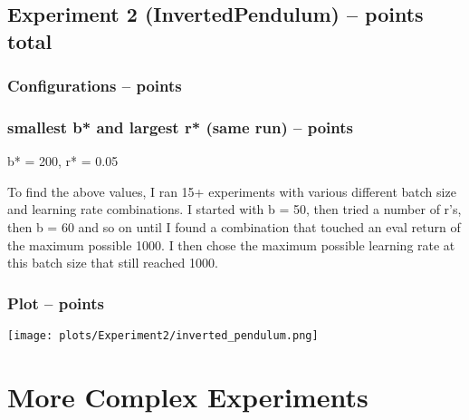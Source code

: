 \documentclass{article}
\begin{document}
\subsection{Experiment 2 (InvertedPendulum) --  points total\rbrack}

\subsubsection{Configurations --  points\rbrack}

\subsubsection{smallest \textbf{b*} and largest \textbf{r*} (same run) --  points\rbrack}
\begin{answer}[title=Q5.2.2,height=4cm,width=\linewidth]
b* = 200, r* = 0.05

To find the above values, I ran 15+ experiments with various different batch size and learning rate
combinations. I started with b = 50, then tried a number of r's, then b = 60 and so on until I found
a combination that touched an eval return of the maximum possible 1000. 
I then chose the maximum possible learning rate at this batch size that still reached 1000.
\end{answer}

\subsubsection{Plot --  points\rbrack}
\begin{answer}[title=Q5.2.3,height=10cm,width=\linewidth]
\centering
\texttt{[image: plots/Experiment2/inverted\_pendulum.png]}
\end{answer}

\setcounter{section}{6}
\section{More Complex Experiments}
\end{document}
